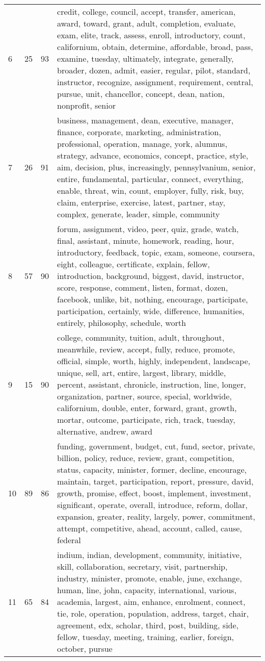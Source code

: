 \begin{table}[ht]
{\begin{tabularx}{\textwidth}{llrX}
    6 & 25 & 93 & credit, college, council, accept, transfer, american, award, toward, grant, adult, completion, evaluate, exam, elite, track, assess, enroll, introductory, count, californium, obtain, determine, affordable, broad, pass, examine, tuesday, ultimately, integrate, generally, broader, dozen, admit, easier, regular, pilot, standard, instructor, recognize, assignment, requirement, central, pursue, unit, chancellor, concept, dean, nation, nonprofit, senior \\ 
    7 & 26 & 91 & business, management, dean, executive, manager, finance, corporate, marketing, administration, professional, operation, manage, york, alumnus, strategy, advance, economics, concept, practice, style, aim, decision, plus, increasingly, pennsylvanium, senior, entire, fundamental, particular, connect, everything, enable, threat, win, count, employer, fully, risk, buy, claim, enterprise, exercise, latest, partner, stay, complex, generate, leader, simple, community \\ 
    8 & 57 & 90 & forum, assignment, video, peer, quiz, grade, watch, final, assistant, minute, homework, reading, hour, introductory, feedback, topic, exam, someone, coursera, eight, colleague, certificate, explain, fellow, introduction, background, biggest, david, instructor, score, response, comment, listen, format, dozen, facebook, unlike, bit, nothing, encourage, participate, participation, certainly, wide, difference, humanities, entirely, philosophy, schedule, worth \\ 
    9 & 15 & 90 & college, community, tuition, adult, throughout, meanwhile, review, accept, fully, reduce, promote, official, simple, worth, highly, independent, landscape, unique, sell, art, entire, largest, library, middle, percent, assistant, chronicle, instruction, line, longer, organization, partner, source, special, worldwide, californium, double, enter, forward, grant, growth, mortar, outcome, participate, rich, track, tuesday, alternative, andrew, award \\ 
   10 & 89 & 86 & funding, government, budget, cut, fund, sector, private, billion, policy, reduce, review, grant, competition, status, capacity, minister, former, decline, encourage, maintain, target, participation, report, pressure, david, growth, promise, effect, boost, implement, investment, significant, operate, overall, introduce, reform, dollar, expansion, greater, reality, largely, power, commitment, attempt, competitive, ahead, account, called, cause, federal \\ 
   11 & 65 & 84 & indium, indian, development, community, initiative, skill, collaboration, secretary, visit, partnership, industry, minister, promote, enable, june, exchange, human, line, john, capacity, international, various, academia, largest, aim, enhance, enrolment, connect, tie, role, operation, population, address, target, chair, agreement, edx, scholar, third, post, building, side, fellow, tuesday, meeting, training, earlier, foreign, october, pursue \\ 

\end{tabularx}}
\end{table}
